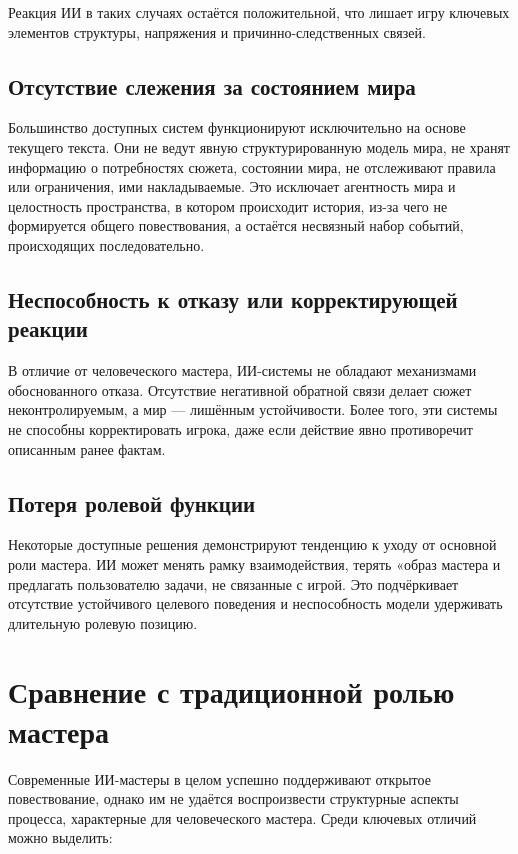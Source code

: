 Реакция ИИ в таких случаях остаётся положительной, что лишает игру ключевых элементов структуры, напряжения и причинно-следственных связей.

\subsection*{Отсутствие слежения за состоянием мира}

Большинство доступных систем функционируют исключительно на основе текущего текста. Они не ведут явную структурированную модель мира, не хранят информацию о потребностях сюжета, состоянии мира, не отслеживают правила или ограничения, ими накладываемые. Это исключает агентность мира и целостность пространства, в котором происходит история, из-за чего не формируется общего повествования, а остаётся несвязный набор событий, происходящих последовательно.

\subsection*{Неспособность к отказу или корректирующей реакции}

В отличие от человеческого мастера, ИИ-системы не обладают механизмами обоснованного отказа. Отсутствие негативной обратной связи делает сюжет неконтролируемым, а мир --- лишённым устойчивости. Более того, эти системы не способны корректировать игрока, даже если действие явно противоречит описанным ранее фактам.

\subsection*{Потеря ролевой функции}

Некоторые доступные решения демонстрируют тенденцию к уходу от основной роли мастера. ИИ может менять рамку взаимодействия, терять «образ мастера и предлагать пользователю задачи, не связанные с игрой. Это подчёркивает отсутствие устойчивого целевого поведения и неспособность модели удерживать длительную ролевую позицию.

\section{Сравнение с традиционной ролью мастера}

Современные ИИ-мастеры в целом успешно поддерживают открытое повествование, однако им не удаётся воспроизвести структурные аспекты процесса, характерные для человеческого мастера. Среди ключевых отличий можно выделить:

